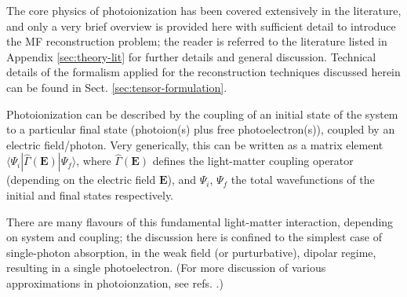 \documentclass[10pt]{article}
\begin{document}


The core physics of photoionization has been covered extensively in the literature, and only a very brief overview is provided here with sufficient detail to introduce the MF reconstruction problem; the reader is referred to the literature listed in Appendix \ref{sec:theory-lit} for further details and general discussion. Technical details of the formalism applied for the reconstruction techniques discussed herein can be found in Sect. \ref{sec:tensor-formulation}.

Photoionization can be described by the coupling of an initial state of the system to a particular final state (photoion(s) plus free photoelectron(s)), coupled by an electric field/photon. Very generically, this can be written as a matrix element $\langle\Psi_i|\hat{\Gamma}(\boldsymbol{\mathbf{E}})|\Psi_f\rangle$, where $\hat{\Gamma}(\boldsymbol{\mathbf{E}})$ defines the light-matter coupling operator (depending on the electric field $\boldsymbol{\mathbf{E}}$), and $\Psi_i$, $\Psi_f$ the total wavefunctions of the initial and final states respectively. 

There are many flavours of this fundamental light-matter interaction, depending on system and coupling; the discussion here is confined to the simplest case of single-photon absorption, in the weak field (or purturbative), dipolar regime, resulting in a single photoelectron. (For more discussion of various approximations in photoionzation, see refs. \cite{Seideman2002,Seideman2001}.)

\end{document}
